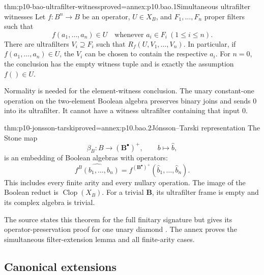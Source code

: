 \begin{hblemma}{thm:p10-bao-ultrafilter-witness}{proved=annex:p10.bao.1}{Simultaneous ultrafilter witnesses}
Let \(f:B^n\to B\) be an operator, \(U\in X_B\), and
\(F_1,\ldots,F_n\) proper filters such that
\[
 f(a_1,\ldots,a_n)\in U
              \quad\text{whenever }a_i\in F_i\ (1\leq i\leq n).
\]
There are ultrafilters \(V_i\supseteq F_i\) such that
\(R_f(U,V_1,\ldots,V_n)\).
In particular, if \(f(a_1,\ldots,a_n)\in U\), the \(V_i\) can be
chosen to contain the respective \(a_i\).
For \(n=0\), the conclusion has the empty witness tuple and is
exactly the assumption \(f()\in U\).
\end{hblemma}

Normality is needed for the element-witness conclusion.
The unary constant-one operation on the two-element Boolean
algebra preserves binary joins and sends \(0\) into its ultrafilter.
It cannot have a witness ultrafilter containing that input \(0\).

\begin{hbtheorem}{thm:p10-jonsson-tarski}{proved=annex:p10.bao.2}{J\'onsson--Tarski representation}
The Stone map
\[
 \beta_B:B\longrightarrow(\mathbf B^\bullet)^+,
 \qquad b\longmapsto\widehat b,
\]
is an embedding of Boolean algebras with operators:
\[
 \widehat{f^B(b_1,\ldots,b_n)}
      =f^{(\mathbf B^\bullet)^+}(\widehat b_1,\ldots,\widehat b_n).
\]
This includes every finite arity and every nullary operation.
The image of the Boolean reduct is
\(\operatorname{Clop}(X_B)\).
For a trivial \(\mathbf B\), its ultrafilter frame is empty and
its complex algebra is trivial.
\end{hbtheorem}

The source states this theorem for the full finitary signature but
gives its operator-preservation proof for one unary diamond
\cite[preprint Theorem~5.15, p.~20]{Venema2005Preprint}.
The annex proves the simultaneous filter-extension lemma and all
finite-arity cases.

\subsection{Canonical extensions}
\label{sec:p10-bao-canonical-extension}

